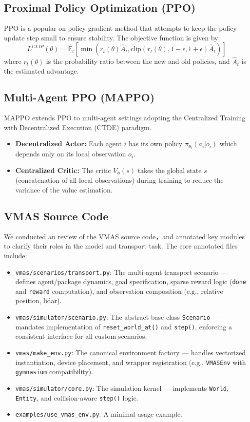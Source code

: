 \documentclass[12pt, a4paper]{article}
\begin{document}
\subsection{Proximal Policy Optimization (PPO)}
PPO is a popular on-policy gradient method that attempts to keep the policy update step small to ensure stability. The objective function is given by:
\begin{equation}
L^{CLIP}(\theta) = \hat{\mathbb{E}}_t \left[ \min(r_t(\theta)\hat{A}_t, \text{clip}(r_t(\theta), 1-\epsilon, 1+\epsilon)\hat{A}_t) \right]
\end{equation}
where $r_t(\theta)$ is the probability ratio between the new and old policies, and $\hat{A}_t$ is the estimated advantage.

\subsection{Multi-Agent PPO (MAPPO)}
MAPPO extends PPO to multi-agent settings adopting the Centralized Training with Decentralized Execution (CTDE) paradigm.
\begin{itemize}
    \item \textbf{Decentralized Actor:} Each agent $i$ has its own policy $\pi_{\theta_i}(a_i|o_i)$ which depends only on its local observation $o_i$.
    \item \textbf{Centralized Critic:} The critic $V_{\phi}(s)$ takes the global state $s$ (concatenation of all local observations) during training to reduce the variance of the value estimation.
\end{itemize}

\subsection{VMAS Source Code}
We conducted an review of the VMAS source code，and annotated key modules to clarify their roles in the model and transport task. The core annotated files include:

\begin{itemize}
    \item \texttt{vmas/scenarios/transport.py}: The multi-agent transport scenario — defines agent/package dynamics, goal specification, sparse reward logic (\texttt{done} and \texttt{reward} computation), and observation composition (e.g., relative position, lidar).
    \item \texttt{vmas/simulator/scenario.py}: The abstract base class \texttt{Scenario} — mandates implementation of \texttt{reset\_world\_at()} and \texttt{step()}, enforcing a consistent interface for all custom scenarios.
    \item \texttt{vmas/make\_env.py}: The canonical environment factory — handles vectorized instantiation, device placement, and wrapper registration (e.g., \texttt{VMASEnv} with \texttt{gymnasium} compatibility).
    \item \texttt{vmas/simulator/core.py}: The simulation kernel — implements \texttt{World}, \texttt{Entity}, and collision-aware \texttt{step()} logic.
    \item \texttt{examples/use\_vmas\_env.py}: A minimal usage example.
\end{itemize}
\end{document}
